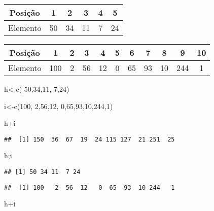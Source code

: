 \documentclass[
]{book}
\newenvironment{Shaded}{\begin{snugshade}}{\end{snugshade}}
\newcommand{\DecValTok}[1]{\textcolor[rgb]{0.00,0.00,0.81}{#1}}
\newcommand{\FunctionTok}[1]{\textcolor[rgb]{0.00,0.00,0.00}{#1}}
\newcommand{\NormalTok}[1]{#1}
\newcommand{\OtherTok}[1]{\textcolor[rgb]{0.56,0.35,0.01}{#1}}
\newcommand{\SpecialCharTok}[1]{\textcolor[rgb]{0.00,0.00,0.00}{#1}}
\begin{document}
\begin{longtable}[]{@{}cccccc@{}}
\toprule
Posição & 1 & 2 & 3 & 4 & 5 \\
\midrule
\endhead
Elemento & 50 & 34 & 11 & 7 & 24 \\
\bottomrule
\end{longtable}

\begin{longtable}[]{@{}ccccccccccc@{}}
\toprule
Posição & 1 & 2 & 3 & 4 & 5 & 6 & 7 & 8 & 9 & 10 \\
\midrule
\endhead
Elemento & 100 & 2 & 56 & 12 & 0 & 65 & 93 & 10 & 244 & 1 \\
\bottomrule
\end{longtable}

\begin{Shaded}
\begin{Highlighting}[]
\NormalTok{h}\OtherTok{\textless{}{-}}\FunctionTok{c}\NormalTok{( }\DecValTok{50}\NormalTok{,}\DecValTok{34}\NormalTok{,}\DecValTok{11}\NormalTok{, }\DecValTok{7}\NormalTok{,}\DecValTok{24}\NormalTok{)}

\NormalTok{i}\OtherTok{\textless{}{-}}\FunctionTok{c}\NormalTok{(}\DecValTok{100}\NormalTok{, }\DecValTok{2}\NormalTok{,}\DecValTok{56}\NormalTok{,}\DecValTok{12}\NormalTok{, }\DecValTok{0}\NormalTok{,}\DecValTok{65}\NormalTok{,}\DecValTok{93}\NormalTok{,}\DecValTok{10}\NormalTok{,}\DecValTok{244}\NormalTok{,}\DecValTok{1}\NormalTok{)}

\NormalTok{h}\SpecialCharTok{+}\NormalTok{i}
\end{Highlighting}
\end{Shaded}

\begin{verbatim}
##  [1] 150  36  67  19  24 115 127  21 251  25
\end{verbatim}

\begin{Shaded}
\begin{Highlighting}[]
\NormalTok{h;i}
\end{Highlighting}
\end{Shaded}

\begin{verbatim}
## [1] 50 34 11  7 24
\end{verbatim}

\begin{verbatim}
##  [1] 100   2  56  12   0  65  93  10 244   1
\end{verbatim}

\begin{Shaded}
\begin{Highlighting}[]
\NormalTok{h}\SpecialCharTok{+}\NormalTok{i}
\end{Highlighting}
\end{Shaded}
\end{document}
